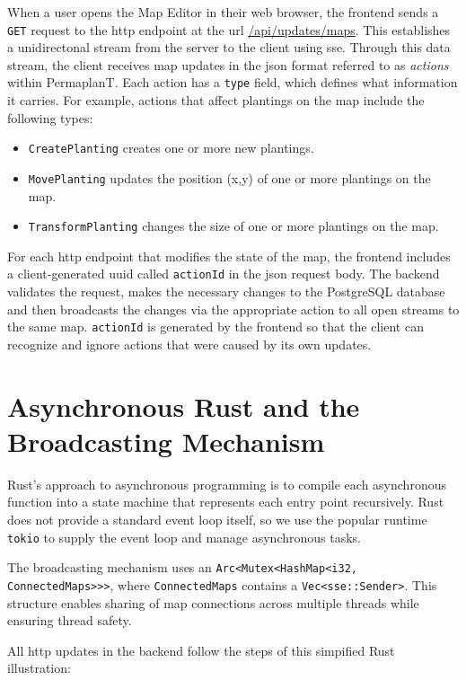 \documentclass[final,draft,oneside]{vutinfth}
\begin{document}
When a user opens the Map Editor in their web browser, the frontend sends a \texttt{GET} request to the \gls{http} endpoint at the url \url{/api/updates/maps}.
This establishes a unidirectonal stream from the server to the client using \gls{sse}.
Through this data stream, the client receives map updates in the \gls{json} format referred to as \emph{actions} within PermaplanT.
Each action has a \texttt{type} field, which defines what information it carries.
For example, actions that affect plantings on the map include the following types:
\begin{itemize}
    \item \texttt{CreatePlanting} creates one or more new plantings.
    \item \texttt{MovePlanting} updates the position (x,y) of one or more plantings on the map.
    \item\texttt{TransformPlanting} changes the size of one or more plantings on the map.
\end{itemize}

For each \gls{http} endpoint that modifies the state of the map, the frontend includes a client-generated \gls{uuid} called \texttt{actionId} in the \gls{json} request body.
The backend validates the request, makes the necessary changes to the PostgreSQL database and then broadcasts the changes via the appropriate action to all open streams to the same map.
\texttt{actionId} is generated by the frontend so that the client can recognize and ignore actions that were caused by its own updates. 

\section{Asynchronous Rust and the Broadcasting Mechanism}

Rust's approach to asynchronous programming is to compile each asynchronous function into a state machine that represents each entry point recursively.
Rust does not provide a standard event loop itself, so we use the popular runtime \texttt{tokio} to supply the event loop and manage asynchronous tasks.

The broadcasting mechanism uses an \texttt{Arc<Mutex<HashMap<i32, ConnectedMaps>>>}, where \texttt{ConnectedMaps} contains a \texttt{Vec<sse::Sender>}.
This structure enables sharing of map connections across multiple threads while ensuring thread safety. 

All \gls{http} updates in the backend follow the steps of this simpified Rust illustration: 
\end{document}

